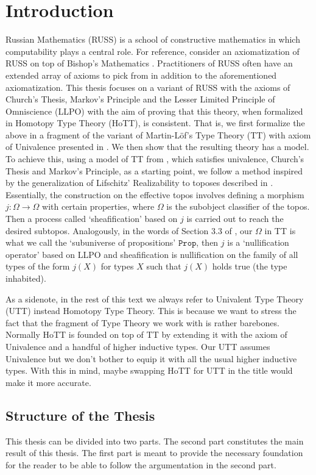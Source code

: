 \documentclass[12pt]{report}
\theoremstyle{definition}
\begin{document}
\chapter{Introduction}
Russian Mathematics (RUSS) is a school of constructive mathematics in which computability plays a central role. 
For reference, consider an axiomatization of RUSS on top of Bishop's Mathematics \cite{bridges_richman_1987_1}. 
Practitioners of RUSS often have an extended array of axioms to pick from in addition to the aforementioned axiomatization. 
This thesis focuses on a variant of RUSS with the axioms of Church's Thesis, Markov's Principle and the Lesser Limited Principle of Omniscience (LLPO) with the aim of proving that this theory, when formalized in Homotopy Type Theory (HoTT), is consistent. 
That is, we first formalize the above in a fragment of the variant of Martin-L\"of's Type Theory (TT) with axiom of Univalence presented in \cite{hottbook}. 
We then show that the resulting theory has a model. 
To achieve this, using a model of TT from \cite{1905.03014}, which satisfies univalence, Church's Thesis and Markov's Principle, as a starting point, we follow a method inspired by the generalization of Lifschitz' Realizability to toposes described in \cite{lifRealGeneralOosten}. 
Essentially, the construction on the effective topos involves defining a morphism $j : \Omega \rightarrow \Omega$ with certain properties, where $\Omega$ is the subobject classifier of the topos. 
Then a process called `sheafification' based on $j$ is carried out to reach the desired subtopos. 
Analogously, in the words of Section 3.3 of \cite{1706.07526}, our $\Omega$ in TT is what we call the `subuniverse of propositions' $\mathtt{Prop}$, then $j$ is a `nullification operator' based on LLPO and sheafification is nullification on the family of all types of the form $j(X)$ for types $X$ such that $j(X)$ holds true (the type inhabited). 

As a sidenote, in the rest of this text we always refer to Univalent Type Theory (UTT) instead Homotopy Type Theory. 
This is because we want to stress the fact that the fragment of Type Theory we work with is rather barebones. 
Normally HoTT is founded on top of TT by extending it with the axiom of Univalence and a handful of higher inductive types. 
Our UTT assumes Univalence but we don't bother to equip it with all the usual higher inductive types. 
With this in mind, maybe swapping HoTT for UTT in the title would make it more accurate. 

\section{Structure of the Thesis}
This thesis can be divided into two parts. 
The second part constitutes the main result of this thesis. 
The first part is meant to provide the necessary foundation for the reader to be able to follow the argumentation in the second part. 
\end{document}
